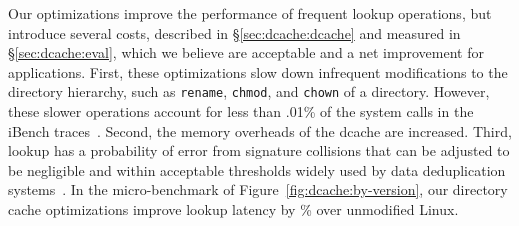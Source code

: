 
Our optimizations improve the performance of frequent lookup operations, but 
introduce several costs, described in \S\ref{sec:dcache:dcache} and measured in \S\ref{sec:dcache:eval},
which  we believe are acceptable and a net improvement for applications.
First, these optimizations slow down infrequent modifications to the directory hierarchy, such as {\tt rename}, {\tt chmod},
 and {\tt chown} of a directory. 
However, these slower operations
account for less than .01\% of the system calls in the iBench traces~\citep{filenotafile}.
Second,  the memory overheads of the dcache are increased.
Third, lookup has a 
probability of error from signature collisions that can be adjusted to be negligible
and within acceptable thresholds widely used by data deduplication systems~\citep{Debnath:2010:CSU:1855840.1855856, Srinivasan:2012:ILI:2208461.2208485, Quinlan:2002:VNA:645371.651321, Zhu:2008:ADB:1364813.1364831}.
In the micro-benchmark of Figure~\ref{fig:dcache:by-version}, our directory cache 
optimizations improve lookup latency by 
\statspeedup{}\% over unmodified Linux.

